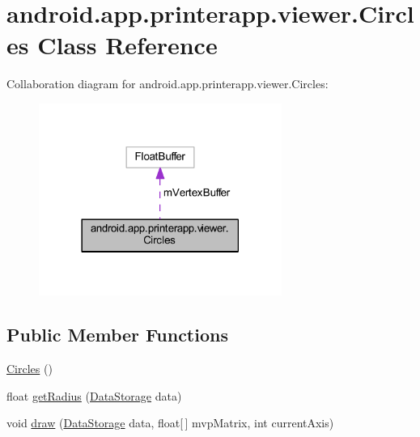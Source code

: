 \hypertarget{classandroid_1_1app_1_1printerapp_1_1viewer_1_1_circles}{}\section{android.\+app.\+printerapp.\+viewer.\+Circles Class Reference}
\label{classandroid_1_1app_1_1printerapp_1_1viewer_1_1_circles}


Collaboration diagram for android.\+app.\+printerapp.\+viewer.\+Circles\+:
\nopagebreak
\begin{figure}[H]
\begin{center}
\leavevmode
\includegraphics[width=225pt]{classandroid_1_1app_1_1printerapp_1_1viewer_1_1_circles__coll__graph}
\end{center}
\end{figure}
\subsection*{Public Member Functions}
\begin{DoxyCompactItemize}
\item 
\hyperlink{classandroid_1_1app_1_1printerapp_1_1viewer_1_1_circles_ae2a856e05c17405d252521fe2c9d5ec2}{Circles} ()
\item 
float \hyperlink{classandroid_1_1app_1_1printerapp_1_1viewer_1_1_circles_a7f148283e42a903347cbfae69135d797}{get\+Radius} (\hyperlink{classandroid_1_1app_1_1printerapp_1_1viewer_1_1_data_storage}{Data\+Storage} data)
\item 
void \hyperlink{classandroid_1_1app_1_1printerapp_1_1viewer_1_1_circles_aee649a9312cf7189052a439a0bc42bdf}{draw} (\hyperlink{classandroid_1_1app_1_1printerapp_1_1viewer_1_1_data_storage}{Data\+Storage} data, float\mbox{[}$\,$\mbox{]} mvp\+Matrix, int current\+Axis)
\end{DoxyCompactItemize}
